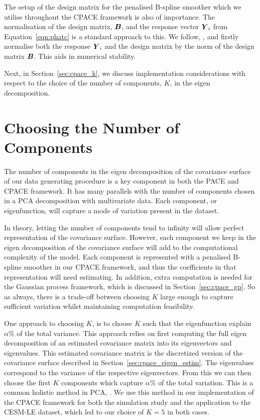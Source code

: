 The setup of the design matrix for the penalised B-spline smoother which we utilise throughout the CPACE framework is also of importance.
The normalisation of the design matrix, $\bm{{B}}$, and the response vector $\bm{{Y}}_{i}$ from Equation~\ref{eqn:phatc} is a standard approach to this.
We follow, \citep{wood_generalized_2006}, and firstly normalise both the response $\bm{{Y}}_{i}$ and the design matrix by the norm of the design matrix $\bm{{B}}$.
This aids in numerical stability. 

Next, in Section~\ref{sec:cpace_k}, we discuss implementation considerations with respect to the choice of the number of components, $K$, in the eigen decomposition.

\section{Choosing the Number of Components \label{sec:cpace_k}}
The number of components in the eigen decomposition of the covariance surface of our data generating procedure is a key component in both the PACE and CPACE framework.
It has many parallels with the number of components chosen in a PCA decomposition with multivariate data. 
Each component, or eigenfunction, will capture a mode of variation present in the dataset.

In theory, letting the number of components tend to infinity will allow perfect representation of the covariance surface.
However, each component we keep in the eigen decomposition of the covariance surface will add to the computational complexity of the model.
Each component is represented with a penalised B-spline smoother in our CPACE framework, and thus the coefficients in that representation will need estimating. 
In addition, extra computation is needed for the Gaussian process framework, which is discussed in Section~\ref{sec:cpace_gp}.
So as always, there is a trade-off between choosing $K$ large enough to capture sufficient variation whilst maintaining computation feasibility.

One approach to choosing $K$, is to choose $K$ such that the eigenfunction explain $\alpha$\% of the total variance.
This approach relies on first computing the full eigen decomposition of an estimated covariance matrix into its eigenvectors and eigenvalues.
This estimated covariance matrix is the discretized version of the covariance surface described in Section~\ref{sec:cpace_eigen_estim}.
The eigenvalues correspond to the variance of the respective eigenvectors.
From this we can then choose the first $K$ components which capture $\alpha$\% of the total variation. 
This is a common holistic method in PCA, \citep{jolliffe_choosing_2002}.
We use this method in our implementation of the CPACE framework for both the simulation study and the application to the CESM-LE dataset, which led to our choice of $K=5$ in both cases.

